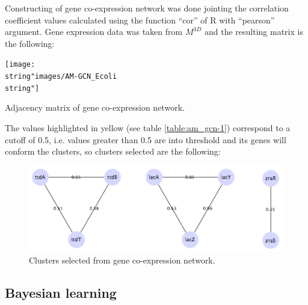 \documentclass{bmcart}
\begin{document}
Constructing of gene co-expression network was done jointing the correlation coefficient values calculated using the function \textquotedblleft cor\textquotedblright{} of R with \textquotedblleft pearson\textquotedblright{} argument. Gene expression data was taken from $M^{3D}$ \cite{doi:10.1093/nar/gkm815} and the resulting matrix is the following:
\begin{table}
\texttt{[image: \\string"images/AM-GCN\_Ecoli\\string"]} \centering \label{table:am_gcn-1} 
\caption{Adjacency matrix of gene co-expression network.}
\end{table}
The values highlighted in yellow (see table \ref{table:am_gcn-1}) correspond to a cutoff of 0.5, i.e. values greater than 0.5 are into threshold and its genes will conform the clusters, so clusters selected are the following:
\begin{figure}
\includegraphics[scale=2]{images/Clusters-GCN_Ecoli} \centering
\caption{Clusters selected from gene co-expression network.}
\label{fig:mod_GCN-1} 
\end{figure}

\subsection*{Bayesian learning}
\end{document}
